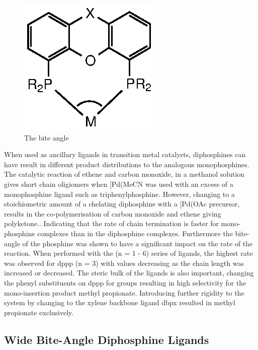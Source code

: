 \begin{figure}[ht]
\centering
\includegraphics[]{../Figures/Biteangle.eps}
\caption[The bite angle]{The bite angle}
\label{Biteangle}
\end{figure}

When used as ancillary ligands in transition metal catalysts, diphosphines can have result in different product distributions to the analogous monophosphines.  The catalytic reaction of ethene and carbon monoxide, in a methanol solution gives short chain oligiomers when [Pd(MeCN\ce{)4](BF4)2} was used with an excess of a monophosphine ligand such as triphenylphosphine.\cite{Lai1984}  However, changing to a stoichiometric amount of a chelating diphosphine with a [Pd(OAc\ce{)2]} precursor, results in the co-polymerisation of carbon monoxide and ethene giving polyketone.\cite{Drent1991}.  Indicating that the rate of chain termination is faster for mono-phosphine complexes than in the diphosphine complexes.  Furthermore the bite-angle of the phosphine was shown to have a significant impact on the rate of the reaction.  When performed with the  (n = 1 - 6) series of ligands, the highest rate was observed for \gls{dppp} (n = 3) with values decreasing as the chain length was increased or decreased.\cite{Drent1991}  The steric bulk of the ligands is also important, changing the phenyl substituents on dppp for \tBu{} groups resulting in high selectivity for the mono-insertion product methyl propionate.  Introducing further rigidity to the system by changing to the xylene backbone ligand \gls{dbpx} resulted in methyl propionate exclusively.\cite{Eastham2000}

\subsection{Wide Bite-Angle Diphosphine Ligands}

